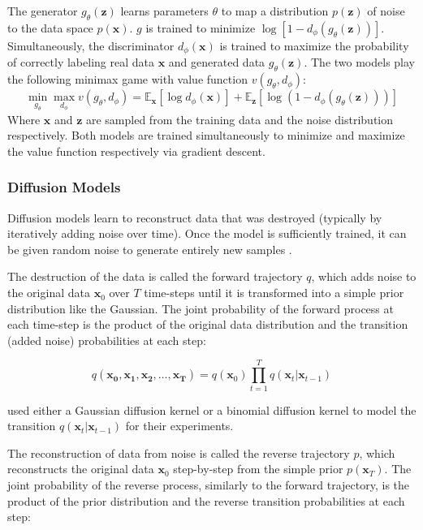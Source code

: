 \documentclass{article}
\begin{document}
The generator $g_{\theta}(\mathbf{z})$ learns parameters $\theta$ to map a distribution $p(\mathbf{z})$ of noise to the data space $p(\mathbf{x})$. $g$ is trained to minimize $\log [1-d_{\phi}(g_{\theta}(\mathbf{z}))]$. Simultaneously, the discriminator $d_{\phi}(\mathbf{x})$ is trained to maximize the probability of correctly labeling real data $\mathbf{x}$ and generated data $g_{\theta}(\mathbf{z})$. The two models play the following minimax game with value function $v(g_{\theta}, d_{\phi})$:
\[\min_{g_{\theta}}\max_{d_{\phi}}v(g_{\theta}, d_{\phi}) = \mathbb{E}_{\mathbf{x}}[\log d_{\phi}(\mathbf{x})] + \mathbb{E}_{\mathbf{z}}[\log (1-d_{\phi}(g_{\theta}(\mathbf{z})))]\]
Where \(\mathbf{x}\) and \(\mathbf{z}\) are sampled from the training data and the noise distribution respectively. Both models are trained simultaneously to minimize and maximize the value function respectively via gradient descent.


\subsubsection{Diffusion Models}
Diffusion models learn to reconstruct data that was destroyed (typically by iteratively adding noise over time). Once the model is sufficiently trained, it can be given random noise to generate entirely new samples \citep{sohl-dickstein_deep_nodate}.

The destruction of the data is called the forward trajectory $q$, which adds noise to the original data $\mathbf{x}_0$ over $T$ time-steps until it is transformed into a simple prior distribution like the Gaussian. The joint probability of the forward process at each time-step is the product of the original data distribution and the transition (added noise) probabilities at each step:

\[q(\mathbf{x_0}, \mathbf{x_1}, \mathbf{x_2}, \ldots, \mathbf{x_T}) = q(\mathbf{x}_0)\prod_{t=1}^{T}q(\mathbf{x}_t|\mathbf{x}_{t-1})\]


\citet{sohl-dickstein_deep_nodate} used either a Gaussian diffusion kernel or a binomial diffusion kernel to model the transition $q(\mathbf{x}_t|\mathbf{x}_{t-1})$ for their experiments. 

The reconstruction of data from noise is called the reverse trajectory $p$, which reconstructs the original data $\mathbf{x}_0$ step-by-step from the simple prior $p(\mathbf{x}_T)$. The joint probability of the reverse process, similarly to the forward trajectory, is the product of the prior distribution and the reverse transition probabilities at each step:
\end{document}
